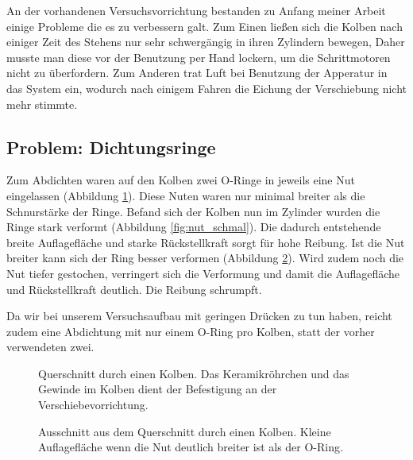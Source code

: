 \documentclass[
    11pt,
    ngerman
]{scrreprt}
\begin{document}
An der vorhandenen Versuchsvorrichtung bestanden zu Anfang meiner Arbeit einige
Probleme die es zu verbessern galt. Zum Einen ließen sich die Kolben nach
einiger Zeit des Stehens nur sehr schwergängig in ihren Zylindern bewegen,
Daher musste man diese vor der Benutzung per Hand lockern, um die
Schrittmotoren nicht zu überfordern. Zum Anderen trat Luft bei Benutzung der
Apperatur in das System ein, wodurch nach einigem Fahren die Eichung der
Verschiebung nicht mehr stimmte.  

\subsection{Problem: Dichtungsringe}

Zum Abdichten waren auf den Kolben zwei O-Ringe in jeweils eine Nut
eingelassen (Abbildung \ref{fig:kolben}). Diese Nuten waren nur minimal
breiter als die Schnurstärke der Ringe. Befand sich der Kolben nun im Zylinder
wurden die Ringe stark verformt (Abbildung \ref{fig:nut_schmal}). Die dadurch
entstehende breite Auflagefläche und starke Rückstellkraft sorgt für hohe
Reibung. Ist die Nut breiter kann sich der Ring besser verformen (Abbildung
\ref{fig:nut_breit}). Wird zudem noch die Nut tiefer gestochen, verringert
sich die Verformung und damit die Auflagefläche und Rückstellkraft deutlich.
Die Reibung schrumpft.

Da wir bei unserem Versuchsaufbau mit geringen Drücken zu tun haben, reicht
zudem eine Abdichtung mit nur einem O-Ring pro Kolben, statt der vorher
verwendeten zwei.

\begin{figure}[htbp]
    \centering
    
    \caption{%
        Querschnitt durch einen Kolben. Das Keramikröhrchen und das Gewinde im Kolben dient der Befestigung an der Verschiebevorrichtung.
    }
    \label{fig:kolben}
\end{figure}


\begin{figure}[htbp]
\begin{minipage}[htbp]{.45\textwidth}
    \centering
    
    \caption{%
        Ausschnitt aus dem Querschnitt durch einen Kolben. Breite Auflagefläche des O-Rings bei zu schmaler Nut.
    }
    \label{fig:nut_schmal}
\end{minipage}
\hfill
\begin{minipage}[htbp]{.45\textwidth}
    \centering
    
    \caption{%
        Ausschnitt aus dem Querschnitt durch einen Kolben. Kleine Auflagefläche wenn die Nut deutlich breiter ist als der O-Ring.
    }
    \label{fig:nut_breit}
\end{minipage}
\end{figure}
\end{document}
